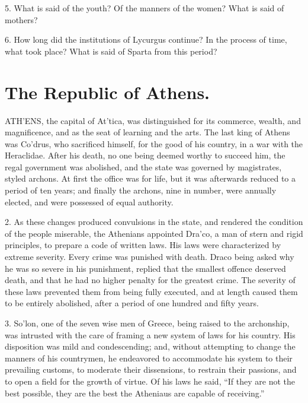 \documentclass[openany,a4paper]{memoir}
\begin{document}
5. What is said of the youth? Of the manners of 
the women? What is said of mothers? 

6. How long did the institutions of Lycurgus continue? In the process of time, what took place? What is said of Sparta from this period? 



\chapter{The Republic of Athens.}

ATH'ENS, the capital of At'tica, was distinguished for 
its commerce, wealth, and magnificence, and as the seat 
of learning and the arts. The last king of Athens was Co'drus, who sacrificed himself, for the good of his country, in 
a war with the Heraclidae. After his death, no one being deemed worthy to succeed him, the regal government was 
abolished, and the state was governed by magistrates, styled 
archons. At first the office was for life, but it was afterwards reduced to a period of ten years; and finally the 
archons, nine in number, were annually elected, and were 
possessed of equal authority. 

2. As these changes produced convulsions in the state, 
and rendered the condition of the people miserable, the 
Athenians appointed Dra'co, a man of stern and rigid principles, to prepare a code of written laws. His laws were 
characterized by extreme severity. Every crime was punished with death. Draco being asked why he was so severe 
in his punishment, replied that the smallest offence deserved 
death, and that he had no higher penalty for the greatest 
crime. The severity of these laws prevented them from 
being fully executed, and at length caused them to be 
entirely abolished, after a period of one hundred and fifty 
years. 

3. So'lon, one of the seven wise men of Greece, being 
raised to the archonship, was intrusted with the care of 
framing a new system of laws for his country. His disposition was mild and condescending; and, without attempting to change the manners of his countrymen, he endeavored 
to accommodate his system to their prevailing customs, to 
moderate their dissensions, to restrain their passions, and to 
open a field for the growth of virtue. Of his laws he said, 
``If they are not the best possible, they are the best the 
Atheniaus are capable of receiving.''
\end{document}
